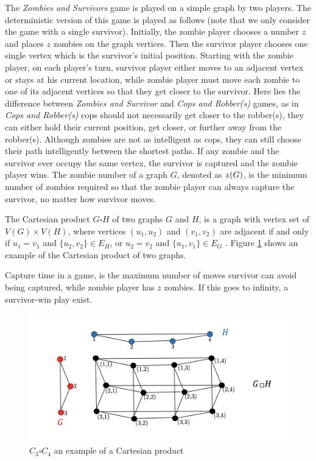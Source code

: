 \documentclass[1p]{elsarticle}
\newcommand{\zn}{\ooalign{$z$\cr\hfil\rule[.5ex]{.2em}{.08ex}\hfil\cr}}
\begin{document}
The {\it Zombies and Survivors} game is played on a simple graph by two players. The deterministic version of this game
\cite{Fitz16} is played as follows (note that we only consider the game with a single survivor). Initially, the zombie
player chooses a number $z$ and places $z$ zombies on the graph vertices. Then the survivor player chooses one single
vertex which is the survivor's initial position. Starting with the zombie player, on each player's turn, survivor player
either moves to an adjacent vertex or stays at his current location, while zombie player must move each zombie to one of
its adjacent vertices so that they get closer to the survivor. Here lies the difference between {\it Zombies and
Survivor} and {\it Cops and Robber(s)} games, as in {\it Cops and Robber(s)} cops should not necessarily get closer to
the robber(s), they can either hold their current position, get closer, or further away from the robber(s). Although
zombies are not as intelligent as cops, they can still choose their path intelligently between the shortest paths.
If any zombie and the survivor ever occupy the same vertex, the survivor is captured and the zombie player wins. The
zombie number of a graph $G$, denoted as $\zn(G)$, is the minimum number of zombies required so that the zombie player can
always capture the survivor, no matter how survivor moves.

The Cartesian product $G \square H$ of two graphs $G$ and $H$, is a graph with vertex set of $V(G) \times V(H)$, where
vertices $(u_1 , u_2)$ and $(v_1 , v_2)$ are adjacent if and only if $u_1 = v_1$ and $ \{ u_2 , v_2 \} \in E_{H} $, or
$u_2 = v_2$ and $ \{u_1 , v_1 \} \in E_{G}$ \cite{West02}. Figure \ref{fig:p2} shows an example of the Cartesian product
of two graphs.

Capture time in a game, is the maximum number of moves survivor can avoid being captured, while zombie player has $z$
zombies. If this goes to infinity, a survivor-win play exist.

\begin{figure}[h!]
	\centering
	\includegraphics[width=0.9\linewidth]{fig/CpWest.png}
	\caption{$C_3 \square C_4$ an example of a Cartesian product}
	\label{fig:p2}
\end{figure}
\end{document}
